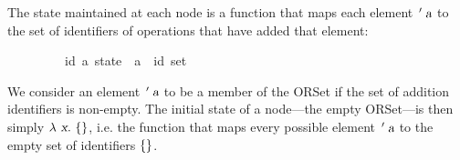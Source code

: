The state maintained at each node is a function that maps each element $\isacharprime\isa{a}$ to the set of identifiers of operations that have added that element:
\vspace{0.25em}
\begin{isabellebody}
\ \ \ \ \ \ \ \ \ {\isacharparenleft}{\isacharprime}id{\isacharcomma}\ {\isacharprime}a{\isacharparenright}\ state\ {\isacharequal}\ {\isachardoublequoteopen}{\isacharprime}a\ {\isasymRightarrow}\ {\isacharprime}id\ set{\isachardoublequoteclose}
\end{isabellebody}
\vspace{0.25em}
We consider an element $\isacharprime\isa{a}$ to be a member of the ORSet if the set of addition identifiers is non-empty.
The initial state of a node---the empty ORSet---is then simply $\isasymlambda\isa{x}\isachardot\ \isacharbraceleft\isacharbraceright$, i.e. the function that maps every possible element $\isacharprime\isa{a}$ to the empty set of identifiers $\emph{$\{$}\emph{$\}$}$.

